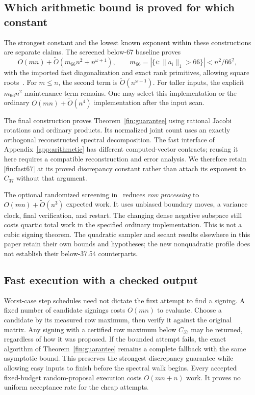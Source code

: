 \documentclass[11pt]{amsart}
\theoremstyle{definition}\newtheorem{definition}[theorem]{Definition}
\theoremstyle{remark}\newtheorem{remark}[theorem]{Remark}
\numberwithin{equation}{section}
\begin{document}
\subsection{Which arithmetic bound is proved for which constant}
\label{fin:arithmetic}
The strongest constant and the lowest known exponent within these
constructions are separate claims. The screened below-67 baseline proves
\begin{equation}\label{fin:fast67}
 O(mn)+\widetilde O(m_{66}n^2+n^{\omega+1}),\qquad
 m_{66}=|\{i:\|a_i\|_1>66\}|<n^2/66^2,
\end{equation}
with the imported fast diagonalization and exact rank primitives,
allowing square roots~\cite[Section~11]{Screened67}.
For $m\le n$, the second term is $\widetilde O(n^{\omega+1})$.
For taller inputs, the explicit $m_{66}n^2$ maintenance term remains.
One may select this implementation or the ordinary
$O(mn)+\widetilde O(n^4)$ implementation after the input scan.

The final construction proves Theorem~\ref{fin:guarantee} using rational
Jacobi rotations and ordinary products. Its normalized joint count
uses an exactly orthogonal reconstructed spectral decomposition.
The fast interface of Appendix~\ref{app:arithmetic} has different
computed-vector contracts; reusing it here requires a compatible
reconstruction and error analysis. We therefore retain
\eqref{fin:fast67} at its proved discrepancy constant rather than
attach its exponent to $C_{37}$ without that argument.

The optional randomized screening in~\cite[Section~6]{Final37}
reduces \emph{row processing} to
$O(mn)+\widetilde O(n^3)$ expected work. It uses unbiased boundary
moves, a variance clock, final verification, and restart. The changing
dense negative subspace still costs quartic total work in the specified
ordinary implementation. This is not a cubic signing theorem.
The quadratic sampler and secant results elsewhere in this paper retain
their own bounds and hypotheses; the new nonquadratic profile does not
establish their below-37.54 counterparts.

\subsection{Fast execution with a checked output}
\label{fin:practical}
Worst-case step schedules need not dictate the first attempt to find a
signing. A fixed number of candidate signings costs $O(mn)$ to evaluate.
Choose a candidate by its measured row maximum, then verify it against
the original matrix. Any signing with a certified row maximum below
$C_{37}$ may be returned, regardless of how it was proposed.
If the bounded attempt fails, the exact algorithm of
Theorem~\ref{fin:guarantee} remains a complete fallback with the same
asymptotic bound. This preserves the strongest discrepancy guarantee
while allowing easy inputs to finish before the spectral walk begins.
Every accepted fixed-budget random-proposal execution costs $O(mn+n)$
work. It proves no uniform acceptance rate for the cheap attempts.
\end{document}
